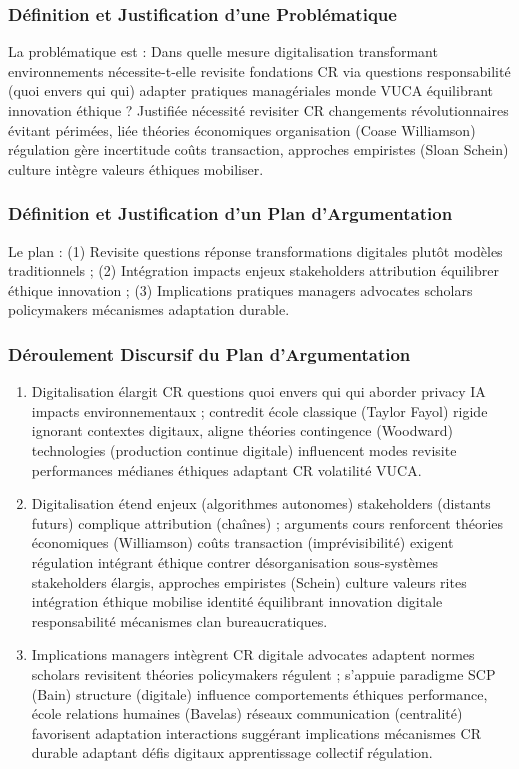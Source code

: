 \documentclass[11pt]{rapportECL}
\begin{document}
\subsubsection{Définition et Justification d’une Problématique}
La problématique est : Dans quelle mesure digitalisation transformant environnements nécessite-t-elle revisite fondations CR via questions responsabilité (quoi envers qui qui) adapter pratiques managériales monde VUCA équilibrant innovation éthique ? Justifiée nécessité revisiter CR changements révolutionnaires évitant périmées, liée théories économiques organisation (Coase Williamson) régulation gère incertitude coûts transaction, approches empiristes (Sloan Schein) culture intègre valeurs éthiques mobiliser.

\subsubsection{Définition et Justification d’un Plan d’Argumentation}
Le plan : (1) Revisite questions réponse transformations digitales plutôt modèles traditionnels ; (2) Intégration impacts enjeux stakeholders attribution équilibrer éthique innovation ; (3) Implications pratiques managers advocates scholars policymakers mécanismes adaptation durable.

\subsubsection{Déroulement Discursif du Plan d’Argumentation}
\begin{enumerate}
\item Digitalisation élargit CR questions quoi envers qui qui aborder privacy IA impacts environnementaux ; contredit école classique (Taylor Fayol) rigide ignorant contextes digitaux, aligne théories contingence (Woodward) technologies (production continue digitale) influencent modes revisite performances médianes éthiques adaptant CR volatilité VUCA.
\item Digitalisation étend enjeux (algorithmes autonomes) stakeholders (distants futurs) complique attribution (chaînes) ; arguments cours renforcent théories économiques (Williamson) coûts transaction (imprévisibilité) exigent régulation intégrant éthique contrer désorganisation sous-systèmes stakeholders élargis, approches empiristes (Schein) culture valeurs rites intégration éthique mobilise identité équilibrant innovation digitale responsabilité mécanismes clan bureaucratiques.
\item Implications managers intègrent CR digitale advocates adaptent normes scholars revisitent théories policymakers régulent ; s’appuie paradigme SCP (Bain) structure (digitale) influence comportements éthiques performance, école relations humaines (Bavelas) réseaux communication (centralité) favorisent adaptation interactions suggérant implications mécanismes CR durable adaptant défis digitaux apprentissage collectif régulation.
\end{enumerate}
\end{document}
